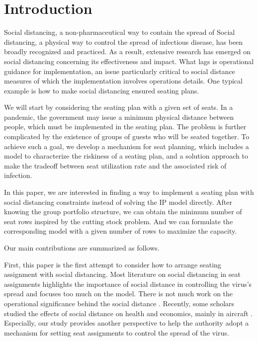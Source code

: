 \section{Introduction}

Social distancing, a non-pharmaceutical way to contain the spread of Social distancing, a physical way to control the spread of infectious disease, has been broadly recognized and practiced. As a result, extensive research has emerged on social distancing concerning its effectiveness and impact. What lags is operational guidance for implementation, an issue particularly critical to social distance measures of which the implementation involves operations details. One typical example is how to make social distancing ensured seating plans.

We will start by considering the seating plan with a given set of seats. In a pandemic, the government may issue a minimum physical distance between people, which must be implemented in the seating plan. The problem is further complicated by the existence of groups of guests who will be seated together. To achieve such
a goal, we develop a mechanism for seat planning, which includes a model to characterize the riskiness of a seating plan, and a solution approach to make the tradeoff between seat utilization rate and the associated risk of infection.

In this paper, we are interested in finding a way to implement a seating plan with social distancing constraints instead of solving the IP model directly.
After knowing the group portfolio structure, we can obtain the minimum number of seat rows inspired by the cutting stock problem.
And we can formulate the corresponding model with a given number of rows to maximize the capacity.


Our main contributions are summarized as follows.

First, this paper is the first attempt to consider how to arrange seating assignment with social distancing. 
Most literature on social distancing in seat assignments highlights the importance of social distance in controlling the virus's spread and focuses too much on the model. There is not much work on the operational significance behind the social distance \cite{barry2021optimal} \cite{fischetti2021safe}.
Recently, some scholars studied the effects of social distance on health and economics, mainly in aircraft \cite{salari2020social} \cite{ghorbani2020model}. Especially, our study provides another perspective to help the authority adopt a mechanism for setting seat assignments to control the spread of the virus.


